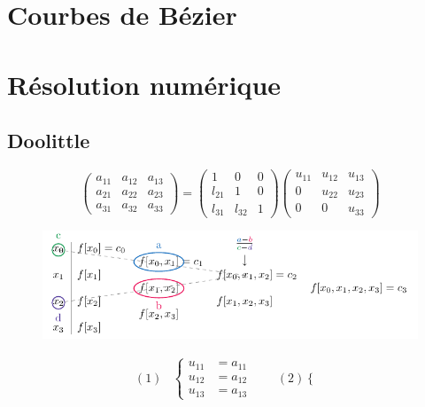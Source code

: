 \documentclass[]{article}
\begin{document}
\begin{multicols}{3}

\pagebreak

\pagebreak

\pagebreak

\pagebreak

\pagebreak



\pagebreak

\pagebreak
\pagebreak


\section{Courbes de Bézier}
\section{Résolution numérique}
\subsection{Doolittle}
$$\begin{pmatrix}
a_{11} & a_{12} & a_{13}\\
a_{21} & a_{22} & a_{23}\\
a_{31} & a_{32} & a_{33}
\end{pmatrix}=\begin{pmatrix}
1 & 0 & 0\\
l_{21} & 1 & 0\\
l_{31} & l_{32} & 1
\end{pmatrix}\begin{pmatrix}
u_{11} & u_{12} & u_{13}\\
0 & u_{22} & u_{23}\\
0 & 0 & u_{33}
\end{pmatrix}$$
\begin{figure}[H]
\centering
\includegraphics[scale=0.6,page=1]{drwg_3.pdf}
\end{figure}
\begin{align*}
(1)&\begin{cases}
u_{11}&=a_{11}\\
u_{12}&=a_{12}\\
u_{13}&=a_{13}
\end{cases} \qquad (2)\begin{cases}

\end{cases}
\end{align*}
\end{multicols}
\end{document}
